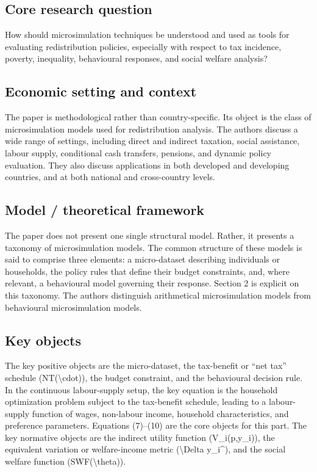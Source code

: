 \documentclass[11pt,a4paper]{article}
\begin{document}
\subsection*{Core research question}
How should microsimulation techniques be understood and used as tools for evaluating redistribution policies, especially with respect to tax incidence, poverty, inequality, behavioural responses, and social welfare analysis?

\subsection*{Economic setting and context}
The paper is methodological rather than country-specific. Its object is the class of microsimulation models used for redistribution analysis. The authors discuss a wide range of settings, including direct and indirect taxation, social assistance, labour supply, conditional cash transfers, pensions, and dynamic policy evaluation. They also discuss applications in both developed and developing countries, and at both national and cross-country levels.

\subsection*{Model / theoretical framework}
The paper does not present one single structural model. Rather, it presents a taxonomy of microsimulation models. The common structure of these models is said to comprise three elements: a micro-dataset describing individuals or households, the policy rules that define their budget constraints, and, where relevant, a behavioural model governing their response. Section 2 is explicit on this taxonomy. The authors distinguish arithmetical microsimulation models from behavioural microsimulation models.

\subsection*{Key objects}
The key positive objects are the micro-dataset, the tax-benefit or “net tax” schedule (NT(\textbackslash{}cdot)), the budget constraint, and the behavioural decision rule. In the continuous labour-supply setup, the key equation is the household optimization problem subject to the tax-benefit schedule, leading to a labour-supply function of wages, non-labour income, household characteristics, and preference parameters. Equations (7)–(10) are the core objects for this part. The key normative objects are the indirect utility function (V\_i(p,y\_i)), the equivalent variation or welfare-income metric (\textbackslash{}Delta y\_i\textasciicircum{}), and the social welfare function (SWF(\textbackslash{}theta)).
\end{document}
